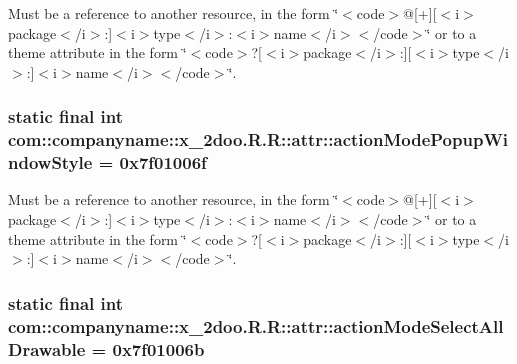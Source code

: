 Must be a reference to another resource, in the form \char`\"{}$<$code$>$@\mbox{[}+\mbox{]}\mbox{[}$<$i$>$package$<$/i$>$:\mbox{]}$<$i$>$type$<$/i$>$:$<$i$>$name$<$/i$>$$<$/code$>$\char`\"{} or to a theme attribute in the form \char`\"{}$<$code$>$?\mbox{[}$<$i$>$package$<$/i$>$:\mbox{]}\mbox{[}$<$i$>$type$<$/i$>$:\mbox{]}$<$i$>$name$<$/i$>$$<$/code$>$\char`\"{}. \hypertarget{classcom_1_1companyname_1_1x__2doo_1_1_r_1_1attr_2c277af2d5ce1caa9df550b48a1d5a8f}{
\subsubsection[{actionModePopupWindowStyle}]{\setlength{\rightskip}{0pt plus 5cm}static final int com::companyname::x\_\-2doo.R.R::attr::actionModePopupWindowStyle = 0x7f01006f}}
\label{classcom_1_1companyname_1_1x__2doo_1_1_r_1_1attr_2c277af2d5ce1caa9df550b48a1d5a8f}


Must be a reference to another resource, in the form \char`\"{}$<$code$>$@\mbox{[}+\mbox{]}\mbox{[}$<$i$>$package$<$/i$>$:\mbox{]}$<$i$>$type$<$/i$>$:$<$i$>$name$<$/i$>$$<$/code$>$\char`\"{} or to a theme attribute in the form \char`\"{}$<$code$>$?\mbox{[}$<$i$>$package$<$/i$>$:\mbox{]}\mbox{[}$<$i$>$type$<$/i$>$:\mbox{]}$<$i$>$name$<$/i$>$$<$/code$>$\char`\"{}. \hypertarget{classcom_1_1companyname_1_1x__2doo_1_1_r_1_1attr_58a4ca000581e80bded2b6c11a265df5}{
\subsubsection[{actionModeSelectAllDrawable}]{\setlength{\rightskip}{0pt plus 5cm}static final int com::companyname::x\_\-2doo.R.R::attr::actionModeSelectAllDrawable = 0x7f01006b}}
\label{classcom_1_1companyname_1_1x__2doo_1_1_r_1_1attr_58a4ca000581e80bded2b6c11a265df5}


